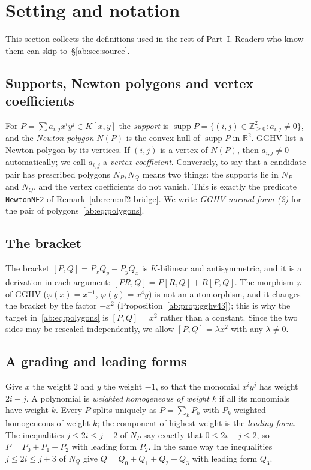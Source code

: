 \documentclass[a4paper,11pt]{article}
\theoremstyle{jsplain}
\theoremstyle{jsdef}
\theoremstyle{jsrem}
\begin{document}
\section{Setting and notation}\label{ab:sec:notation}

This section collects the definitions used in the rest of Part~I. Readers who know them can skip to~\S\ref{ab:sec:source}.

\subsection{Supports, Newton polygons and vertex coefficients}

For $P=\sum a_{i,j}x^iy^j\in K[x,y]$ the \emph{support} is $\operatorname{supp}P=\{(i,j)\in\mathbb{Z}_{\ge0}^2: a_{i,j}\neq0\}$, and the \emph{Newton polygon} $N(P)$ is the convex hull of $\operatorname{supp}P$ in $\mathbb{R}^2$. GGHV list a Newton polygon by its vertices. If $(i,j)$ is a vertex of $N(P)$, then $a_{i,j}\neq0$ automatically; we call $a_{i,j}$ a \emph{vertex coefficient}. Conversely, to say that a candidate pair has prescribed polygons $N_P,N_Q$ means two things: the supports lie in $N_P$ and $N_Q$, and the vertex coefficients do not vanish. This is exactly the predicate \texttt{NewtonNF2} of Remark~\ref{ab:rem:nf2-bridge}. We write \emph{GGHV normal form (2)} for the pair of polygons~\eqref{ab:eq:polygons}.

\subsection{The bracket}

The bracket $[P,Q]=P_xQ_y-P_yQ_x$ is $K$-bilinear and antisymmetric, and it is a derivation in each argument: $[PR,Q]=P[R,Q]+R[P,Q]$. The morphism $\varphi$ of GGHV ($\varphi(x)=x^{-1}$, $\varphi(y)=x^4y$) is not an automorphism, and it changes the bracket by the factor $-x^2$ (Proposition~\ref{ab:prop:gghv43}); this is why the target in~\eqref{ab:eq:polygons} is $[P,Q]=x^2$ rather than a constant. Since the two sides may be rescaled independently, we allow $[P,Q]=\lambda x^2$ with any $\lambda\neq0$.

\subsection{A grading and leading forms}

Give $x$ the weight $2$ and $y$ the weight $-1$, so that the monomial $x^iy^j$ has weight $2i-j$. A polynomial is \emph{weighted homogeneous of weight $k$} if all its monomials have weight $k$. Every $P$ splits uniquely as $P=\sum_kP_k$ with $P_k$ weighted homogeneous of weight $k$; the component of highest weight is the \emph{leading form}. The inequalities $j\le 2i\le j+2$ of $N_P$ say exactly that $0\le 2i-j\le 2$, so $P=P_0+P_1+P_2$ with leading form $P_2$. In the same way the inequalities $j\le 2i\le j+3$ of $N_Q$ give $Q=Q_0+Q_1+Q_2+Q_3$ with leading form $Q_3$.
\end{document}
